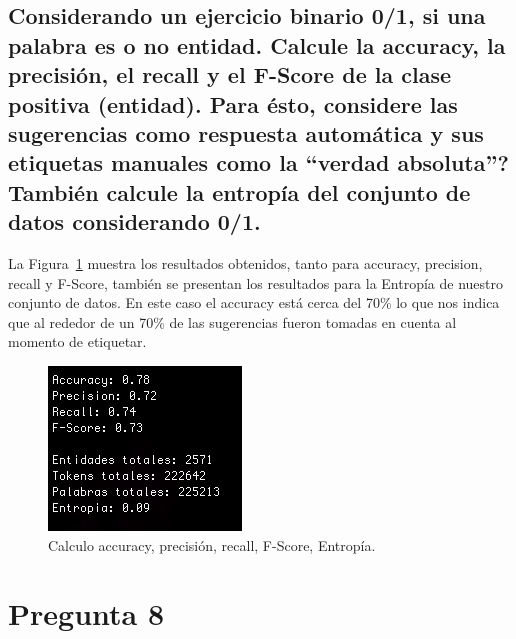 \documentclass{article}
\begin{document}
\subsection{Considerando un ejercicio binario 0/1, si una palabra es o no entidad. Calcule la accuracy, la precisión, el recall y el F-Score de la clase positiva (entidad). Para ésto, considere las sugerencias como respuesta automática y sus etiquetas manuales como la ``verdad absoluta''? También calcule la entropía del conjunto de datos considerando 0/1.}
La Figura~\ref{fig:pregunta7} muestra los resultados obtenidos, tanto para accuracy, precision, recall y F-Score, también se presentan los resultados para la Entropía de nuestro conjunto de datos. En este caso el accuracy está cerca del 70\% lo que nos indica que al rededor de un 70\% de las sugerencias fueron tomadas en cuenta al momento de etiquetar. 
\begin{figure}[h!]
\centering
\includegraphics[scale=0.6]{figuras/pregunta7.png}
\caption{Calculo accuracy, precisión, recall, F-Score, Entropía.}
\label{fig:pregunta7}
\end{figure}

\newpage
\section{Pregunta 8}
\end{document}
